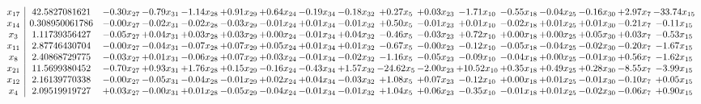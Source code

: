 \documentclass[9pt]{article}
\begin{document}
 \[\begin{array}{c| c c@{\hskip 2pt} c@{\hskip 2pt} c@{\hskip 2pt} c@{\hskip 2pt} c@{\hskip 2pt} c@{\hskip 2pt} c@{\hskip 2pt} c@{\hskip 2pt} c@{\hskip 2pt} c@{\hskip 2pt} c@{\hskip 2pt} c@{\hskip 2pt} c@{\hskip 2pt} c@{\hskip 2pt} c@{\hskip 2pt} }
 x_{17}   &  42.5827081621 & -0.30 x_{27} & -0.79 x_{31} & -1.14 x_{28} & +  0.91 x_{29} & +  0.64 x_{24} & -0.19 x_{34} & -0.18 x_{32} & +  0.27 x_{5} & +  0.03 x_{23} & -1.71 x_{10} & -0.55 x_{18} & -0.04 x_{25} & -0.16 x_{30} & +  2.97 x_{7} & -33.74 x_{15}\\
 x_{14}   &  0.308950061786 & -0.00 x_{27} & -0.02 x_{31} & -0.02 x_{28} & -0.03 x_{29} & -0.01 x_{24} & +  0.01 x_{34} & -0.01 x_{32} & +  0.50 x_{5} & -0.01 x_{23} & +  0.01 x_{10} & -0.02 x_{18} & +  0.01 x_{25} & +  0.01 x_{30} & -0.21 x_{7} & -0.11 x_{15}\\
 x_{3}   &  1.11739356427 & -0.05 x_{27} & +  0.04 x_{31} & +  0.03 x_{28} & +  0.03 x_{29} & +  0.00 x_{24} & -0.01 x_{34} & +  0.04 x_{32} & -0.46 x_{5} & -0.03 x_{23} & +  0.72 x_{10} & +  0.00 x_{18} & +  0.00 x_{25} & +  0.05 x_{30} & +  0.03 x_{7} & -0.53 x_{15}\\
 x_{11}   &  2.87746430704 & -0.00 x_{27} & -0.04 x_{31} & -0.07 x_{28} & +  0.07 x_{29} & +  0.05 x_{24} & +  0.01 x_{34} & +  0.01 x_{32} & -0.67 x_{5} & -0.00 x_{23} & -0.12 x_{10} & -0.05 x_{18} & -0.04 x_{25} & -0.02 x_{30} & -0.20 x_{7} & -1.67 x_{15}\\
 x_{8}   &  2.40868729775 & -0.03 x_{27} & +  0.01 x_{31} & -0.06 x_{28} & +  0.07 x_{29} & +  0.03 x_{24} & -0.01 x_{34} & -0.02 x_{32} & -1.16 x_{5} & -0.05 x_{23} & -0.09 x_{10} & -0.04 x_{18} & +  0.00 x_{25} & -0.01 x_{30} & +  0.56 x_{7} & -1.62 x_{15}\\
 x_{21}   &  11.5699380452 & -0.70 x_{27} & +  0.93 x_{31} & +  1.76 x_{28} & +  0.15 x_{29} & -0.16 x_{24} & -0.43 x_{34} & +  1.57 x_{32} & -24.62 x_{5} & -2.00 x_{23} & + 10.52 x_{10} & +  0.35 x_{18} & +  0.49 x_{25} & +  0.28 x_{30} & -8.55 x_{7} & -3.99 x_{15}\\
 x_{12}   &  2.16139770338 & -0.00 x_{27} & -0.05 x_{31} & -0.04 x_{28} & -0.01 x_{29} & +  0.02 x_{24} & +  0.04 x_{34} & -0.03 x_{32} & +  1.08 x_{5} & +  0.07 x_{23} & -0.12 x_{10} & +  0.00 x_{18} & +  0.01 x_{25} & -0.01 x_{30} & -0.10 x_{7} & +  0.05 x_{15}\\
 x_{4}   &  2.09519919727 & +  0.03 x_{27} & -0.00 x_{31} & +  0.01 x_{28} & -0.05 x_{29} & -0.04 x_{24} & -0.01 x_{34} & -0.01 x_{32} & +  1.04 x_{5} & +  0.06 x_{23} & -0.35 x_{10} & -0.01 x_{18} & +  0.01 x_{25} & -0.02 x_{30} & -0.06 x_{7} & +  0.90 x_{15}\\

\end{array}\]
\end{document}
